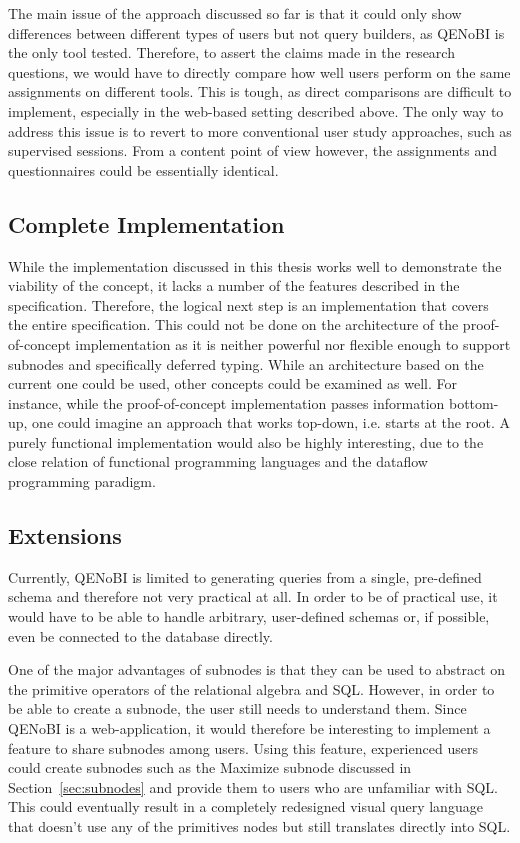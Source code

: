 \documentclass[11pt,a4paper]{globis-book}
\begin{document}
The main issue of the approach discussed so far is that it could only show differences between different types of users but not query builders, as QENoBI is the only tool tested. Therefore, to assert the claims made in the research questions, we would have to directly compare how well users perform on the same assignments on different tools. This is tough, as direct comparisons are difficult to implement, especially in the web-based setting described above. The only way to address this issue is to revert to more conventional user study approaches, such as supervised sessions. From a content point of view however, the assignments and questionnaires could be essentially identical.

\subsection{Complete Implementation}
While the implementation discussed in this thesis works well to demonstrate the viability of the concept, it lacks a number of the features described in the specification. Therefore, the logical next step is an implementation that covers the entire specification. This could not be done on the architecture of the proof-of-concept implementation as it is neither powerful nor flexible enough to support subnodes and specifically deferred typing. While an architecture based on the current one could be used, other concepts could be examined as well. For instance, while the proof-of-concept implementation passes information bottom-up, one could imagine an approach that works top-down, i.e. starts at the root. A purely functional implementation would also be highly interesting, due to the close relation of functional programming languages and the dataflow programming paradigm.

\subsection{Extensions}
Currently, QENoBI is limited to generating queries from a single, pre-defined schema and therefore not very practical at all. In order to be of practical use, it would have to be able to handle arbitrary, user-defined schemas or, if possible, even be connected to the database directly.

One of the major advantages of subnodes is that they can be used to abstract on the primitive operators of the relational algebra and SQL. However, in order to be able to create a subnode, the user still needs to understand them. Since QENoBI is a web-application, it would therefore be interesting to implement a feature to share subnodes among users. Using this feature, experienced users could create subnodes such as the Maximize subnode discussed in Section~\ref{sec:subnodes} and provide them to users who are unfamiliar with SQL. This could eventually result in a completely redesigned visual query language that doesn't use any of the primitives nodes but still translates directly into SQL.
\end{document}
